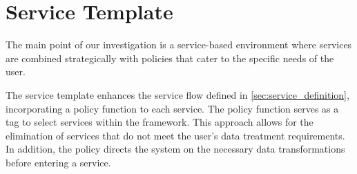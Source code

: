 


%




\section{Service Template}\label{sec:service_template}
The main point of our investigation is a service-based environment where services are combined strategically with policies that cater to the specific needs of the user.

The service template enhances the service flow defined in \cref{sec:service_definition}, incorporating a policy function to each service.
The policy function serves as a tag to select services within the framework.
This approach allows for the elimination of services that do not meet the user's data treatment requirements.
In addition, the policy directs the system on the necessary data transformations before entering a service.


